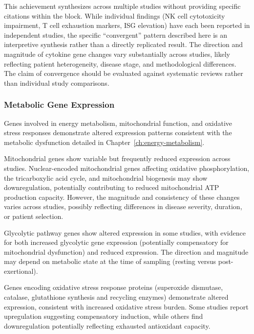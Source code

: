 \begin{warning}
This achievement synthesizes across multiple studies without providing specific citations within the block. While individual findings (NK cell cytotoxicity impairment, T cell exhaustion markers, ISG elevation) have each been reported in independent studies, the specific ``convergent'' pattern described here is an interpretive synthesis rather than a directly replicated result. The direction and magnitude of cytokine gene changes vary substantially across studies, likely reflecting patient heterogeneity, disease stage, and methodological differences. The claim of convergence should be evaluated against systematic reviews rather than individual study comparisons.
\end{warning}

\subsubsection{Metabolic Gene Expression}

Genes involved in energy metabolism, mitochondrial function, and oxidative stress responses demonstrate altered expression patterns consistent with the metabolic dysfunction detailed in Chapter~\ref{ch:energy-metabolism}.

Mitochondrial genes show variable but frequently reduced expression across studies. Nuclear-encoded mitochondrial genes affecting oxidative phosphorylation, the tricarboxylic acid cycle, and mitochondrial biogenesis may show downregulation, potentially contributing to reduced mitochondrial ATP production capacity. However, the magnitude and consistency of these changes varies across studies, possibly reflecting differences in disease severity, duration, or patient selection.

Glycolytic pathway genes show altered expression in some studies, with evidence for both increased glycolytic gene expression (potentially compensatory for mitochondrial dysfunction) and reduced expression. The direction and magnitude may depend on metabolic state at the time of sampling (resting versus post-exertional).

Genes encoding oxidative stress response proteins (superoxide dismutase, catalase, glutathione synthesis and recycling enzymes) demonstrate altered expression, consistent with increased oxidative stress burden. Some studies report upregulation suggesting compensatory induction, while others find downregulation potentially reflecting exhausted antioxidant capacity.

